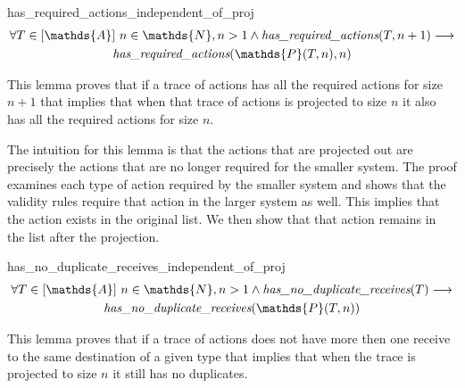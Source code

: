 \documentclass[runningheads]{llncs}
\newcommand{\action}{\mathds{A}}
\newcommand{\listaction}{[\action]}
\newcommand{\projectsize}[2]{\mathds{P}(#1, #2)}
\newcommand{\hra}[2]{\emph{has\_required\_actions}(#1, #2)}
\newcommand{\hndr}[1]{\emph{has\_no\_duplicate\_receives}(#1)}
\begin{document}

\begin{lemma}{has\_required\_actions\_independent\_of\_proj}
\begin{multline*}
\forall T \in \listaction\ n \in \mathds{N}, n > 1 \wedge \hra{T}{n+1} \longrightarrow \\
\hra{\projectsize{T}{n}}{n}
\end{multline*}
\end{lemma}


This lemma proves that if a trace of actions has all the required actions for size $n+1$ that implies that when that trace of actions is projected to size $n$ it also has all the required actions for size $n$. 

The intuition for this lemma is that the actions that are projected out are precisely the actions that are no longer required for the smaller system. The proof examines each type of action required by the smaller system and shows that the validity rules require that action in the larger system as well. This implies that the action exists in the original list. We then show that that action remains in the list after the projection.

\begin{lemma}{has\_no\_duplicate\_receives\_independent\_of\_proj}
\begin{multline*}
\forall T \in \listaction\ n \in \mathds{N}, n > 1 \wedge \hndr{T} \longrightarrow \\
\hndr{\projectsize{T}{n}}
\end{multline*}
\end{lemma}
This lemma proves that if a trace of actions does not have more then one receive to the same destination of a given type that implies that when the trace is projected to size $n$ it still has no duplicates.
\end{document}
